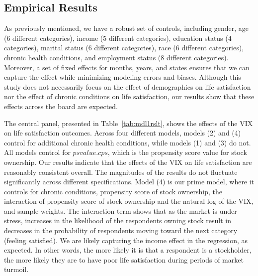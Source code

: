 \documentclass[11pt,a4paper,oldfontcommands]{memoir}
\begin{document}
{\subsection{Empirical Results}

As previously mentioned, we have a robust set of controls, including gender, age (6 different categories), income (5 different categories), education status (4 categories), marital status (6 different categories), race (6 different categories), chronic health conditions, and employment status (8 different categories). Moreover, a set of fixed effects for months, years, and states ensures that we can capture the effect while minimizing modeling errors and biases. Although this study does not necessarily focus on the effect of demographics on life satisfaction nor the effect of chronic conditions on life satisfaction, our results show that these effects across the board are expected.

The central panel, presented in Table~\ref{tab:mdl1rslt}, shows the effects of the VIX on life satisfaction outcomes. Across four different models, models (2) and (4) control for additional chronic health conditions, while models (1) and (3) do not. All models control for $psvalue.cps$, which is the propensity score value for stock ownership. Our results indicate that the effects of the VIX on life satisfaction are reasonably consistent overall. The magnitudes of the results do not fluctuate significantly across different specifications. Model (4) is our prime model, where it controls for chronic conditions, propensity score of stock ownership, the interaction of propensity score of stock ownership and the natural log of the VIX, and sample weights. The interaction term shows that as the market is under stress, increases in the likelihood of the respondents owning stock result in decreases in the probability of respondents moving toward the next category (feeling satisfied). We are likely capturing the income effect in the regression, as expected. In other words, the more likely it is that a respondent is a stockholder, the more likely they are to have poor life satisfaction during periods of market turmoil.

}
\end{document}
